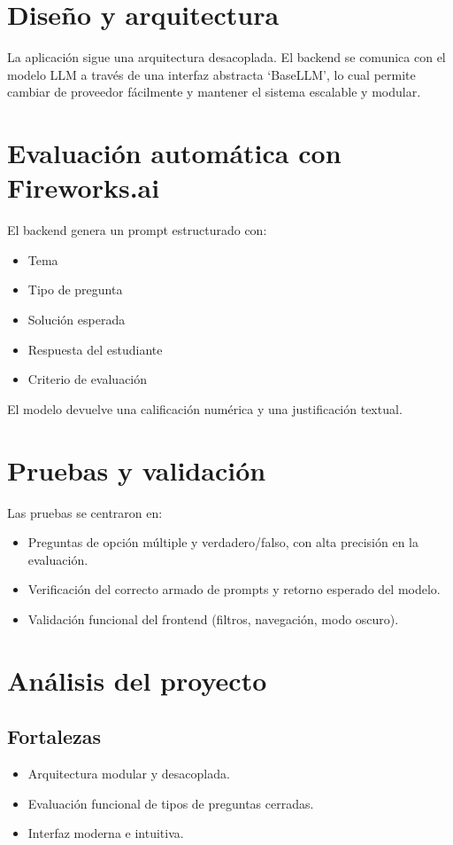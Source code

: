 \documentclass[12pt]{article}
\begin{document}
\section{Diseño y arquitectura}
La aplicación sigue una arquitectura desacoplada. El backend se comunica con el modelo LLM a través de una interfaz abstracta `BaseLLM', lo cual permite cambiar de proveedor fácilmente y mantener el sistema escalable y modular.

\section{Evaluación automática con Fireworks.ai}
El backend genera un prompt estructurado con:
\begin{itemize}
  \item Tema
  \item Tipo de pregunta
  \item Solución esperada
  \item Respuesta del estudiante
  \item Criterio de evaluación
\end{itemize}
El modelo devuelve una calificación numérica y una justificación textual.

\section{Pruebas y validación}
Las pruebas se centraron en:
\begin{itemize}
  \item Preguntas de opción múltiple y verdadero/falso, con alta precisión en la evaluación.
  \item Verificación del correcto armado de prompts y retorno esperado del modelo.
  \item Validación funcional del frontend (filtros, navegación, modo oscuro).
\end{itemize}

\section{Análisis del proyecto}
\subsection*{Fortalezas}
\begin{itemize}
  \item Arquitectura modular y desacoplada.
  \item Evaluación funcional de tipos de preguntas cerradas.
  \item Interfaz moderna e intuitiva.
\end{itemize}
\end{document}
